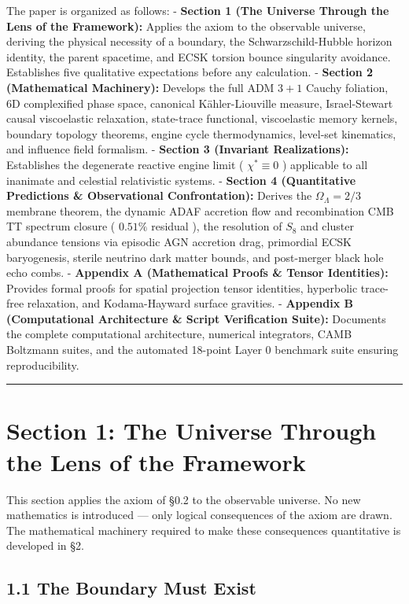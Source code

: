 \documentclass[11pt,a4paper]{article}
\theoremstyle{definition}\newtheorem{definition}{Definition}
\theoremstyle{remark}\newtheorem{remark}{Remark}
\begin{document}
The paper is organized as follows:
- \textbf{Section 1 (The Universe Through the Lens of the Framework):} Applies the axiom to the observable universe, deriving the physical necessity of a boundary, the Schwarzschild-Hubble horizon identity, the parent spacetime, and ECSK torsion bounce singularity avoidance. Establishes five qualitative expectations before any calculation.
- \textbf{Section 2 (Mathematical Machinery):} Develops the full ADM $3+1$ Cauchy foliation, 6D complexified phase space, canonical Kähler-Liouville measure, Israel-Stewart causal viscoelastic relaxation, state-trace functional, viscoelastic memory kernels, boundary topology theorems, engine cycle thermodynamics, level-set kinematics, and influence field formalism.
- \textbf{Section 3 (Invariant Realizations):} Establishes the degenerate reactive engine limit ( $\chi^* \equiv 0$ ) applicable to all inanimate and celestial relativistic systems.
- \textbf{Section 4 (Quantitative Predictions \& Observational Confrontation):} Derives the $\Omega_\Lambda = 2/3$ membrane theorem, the dynamic ADAF accretion flow and recombination CMB TT spectrum closure ( $0.51\%$ residual ), the resolution of $S_8$ and cluster abundance tensions via episodic AGN accretion drag, primordial ECSK baryogenesis, sterile neutrino dark matter bounds, and post-merger black hole echo combs.
- \textbf{Appendix A (Mathematical Proofs \& Tensor Identities):} Provides formal proofs for spatial projection tensor identities, hyperbolic trace-free relaxation, and Kodama-Hayward surface gravities.
- \textbf{Appendix B (Computational Architecture \& Script Verification Suite):} Documents the complete computational architecture, numerical integrators, CAMB Boltzmann suites, and the automated 18-point Layer 0 benchmark suite ensuring reproducibility.

\noindent\rule{\linewidth}{0.4pt}
\section{Section 1: The Universe Through the Lens of the Framework}

This section applies the axiom of §0.2 to the observable universe. No new mathematics is introduced — only logical consequences of the axiom are drawn. The mathematical machinery required to make these consequences quantitative is developed in §2.
\subsection{1.1 The Boundary Must Exist}
\end{document}
